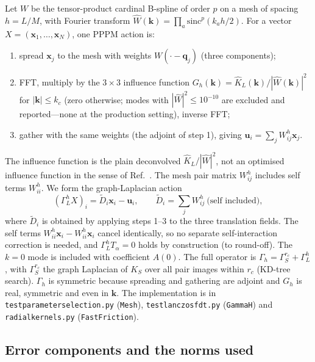 \documentclass[11pt]{article}
\DeclareRobustCommand{\_}{\textunderscore\allowbreak}
\theoremstyle{remark}
\theoremstyle{definition}
\newcommand{\bq}{\mathbf{q}}
\newcommand{\bk}{\mathbf{k}}
\newcommand{\bx}{\mathbf{x}}
\newcommand{\Gh}{\Gamma_h}
\begin{document}
Let $W$ be the tensor-product cardinal B-spline of order $p$ on a mesh of spacing $h=L/M$, with Fourier transform
$\hat W(\bk)=\prod_a\mathrm{sinc}^p(k_ah/2)$. For a vector $X=(\bx_1,\dots,\bx_N)$, one PPPM action is:
\begin{enumerate}
\item spread $\bx_j$ to the mesh with weights $W(\cdot-\bq_j)$ (three components);
\item FFT, multiply by the $3\times3$ influence function
$G_h(\bk)=\hat K_L(\bk)/|\hat W(\bk)|^2$ for $|\bk|\le k_c$ (zero otherwise; modes with $|\hat W|^2\le10^{-10}$ are
excluded and reported---none at the production setting), inverse FFT;
\item gather with the same weights (the adjoint of step 1), giving $\mathbf u_i=\sum_jW^h_{ij}\bx_j$.
\end{enumerate}
The influence function is the plain deconvolved $\hat K_L/|\hat W|^2$, not an optimised influence function in the sense
of Ref.~\cite{HockneyEastwood1988}. The mesh pair matrix $W^h_{ij}$ includes self terms $W^h_{ii}$. We form the
graph-Laplacian action
\begin{equation}\label{eq:pppm_lap}
(\Gamma_L^h X)_i=\tilde D_i\bx_i-\mathbf u_i,\qquad \tilde D_i=\sum_jW^h_{ij}\ \text{(self included)},
\end{equation}
where $\tilde D_i$ is obtained by applying steps 1--3 to the three translation fields. The self terms
$W^h_{ii}\bx_i-W^h_{ii}\bx_i$ cancel identically, so no separate self-interaction correction is needed, and
$\Gamma^h_LT_\alpha=0$ holds by construction (to round-off). The $k=0$ mode is included with coefficient $A(0)$.
The full operator is $\Gh=\Gamma_S^{r_c}+\Gamma_L^h$, with $\Gamma_S^{r_c}$ the graph Laplacian of $K_S$ over all
pair images within $r_c$ (KD-tree search). $\Gh$ is symmetric because spreading and gathering are adjoint and $G_h$
is real, symmetric and even in $\bk$. The implementation is in
\texttt{test\_parameter\_selection.py} (\texttt{Mesh}), \texttt{test\_lanczos\_fdt.py} (\texttt{GammaH}) and
\texttt{radial\_kernels.py} (\texttt{FastFriction}).

\subsection{Error components and the norms used}\label{sec:errors}
\end{document}

